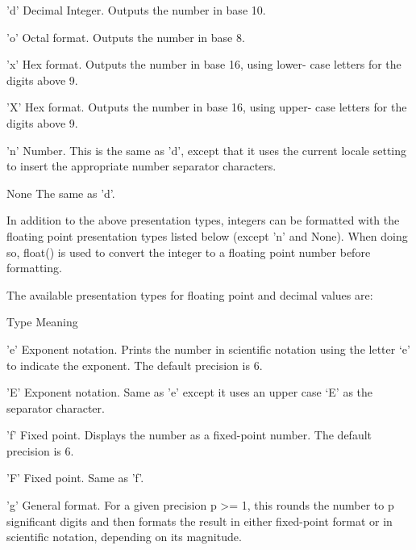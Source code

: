 'd' \hspace*{0.5in} Decimal Integer. Outputs the number in base 10. \par
'o' \hspace*{0.5in} Octal format. Outputs the number in base 8. \par
'x' \hspace*{0.5in} Hex format. Outputs the number in base 16, using lower- case letters for the digits above 9. \par
'X' \hspace*{0.5in} Hex format. Outputs the number in base 16, using upper- case letters for the digits above 9. \par
'n' \hspace*{0.5in} Number. This is the same as 'd', except that it uses the current locale setting to insert the appropriate number separator characters. \par
None \hspace*{0.5in} The same as 'd'. \par
In addition to the above presentation types, integers can be formatted with the floating point presentation types listed below (except 'n' and None). When doing so, float() is used to convert the integer to a floating point number before formatting. \par
The available presentation types for floating point and decimal values are: \par
Type \hspace*{0.5in} Meaning \par
'e' \hspace*{0.5in} Exponent notation. Prints the number in scientific notation using the letter ‘e’ to indicate the exponent. The default precision is 6. \par
'E' \hspace*{0.5in} Exponent notation. Same as 'e' except it uses an upper case ‘E’ as the separator character. \par
'f' \hspace*{0.5in} Fixed point. Displays the number as a fixed-point number. The default precision is 6. \par
'F' \hspace*{0.5in} Fixed point. Same as 'f'. \par
'g' \hspace*{0.5in} General format. For a given precision p >= 1, this rounds the number to p significant digits and then formats the result in either fixed-point format or in scientific notation, depending on its magnitude. \par
